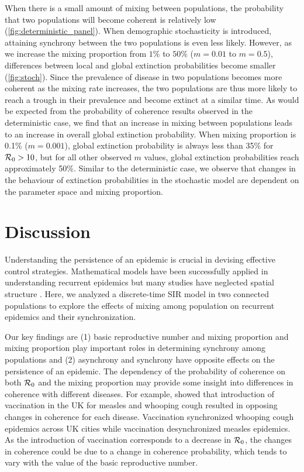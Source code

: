 \documentclass[12pt]{article}
\newcommand{\R}{{\cal R}}
\begin{document}
When there is a small amount of mixing between populations, the probability that two populations will become coherent is relatively low (\autoref{fig:deterministic_panel}).
When demographic stochasticity is introduced, attaining synchrony between the two populations is even less likely. 
However, as we increase the mixing proportion from $1\%$ to $50\%$ ($m=0.01$ to $m=0.5$), differences between local and global extinction probabilities become smaller (\autoref{fig:stoch}).
Since the prevalence of disease in two populations becomes more coherent as the mixing rate increases, the two populations are thus more likely to reach a trough in their prevalence and become extinct at a similar time. 
As would be expected from the probability of coherence results observed in the deterministic case, we find that an increase in mixing between populations leads to an increase in overall global extinction probability. When mixing proportion is 0.1\% ($m = 0.001$), global extinction probability is always less than 35\% for $\R_0 > 10$, but for all other observed $m$ values, global extinction probabilities reach approximately 50\%. 
Similar to the deterministic case, we observe that changes in the behaviour of extinction probabilities in the stochastic model are dependent on the parameter space and mixing proportion.

\section{Discussion}
\label{sec:discussion}

Understanding the persistence of an epidemic is crucial in devising effective control strategies.
Mathematical models have been successfully applied in understanding recurrent epidemics but many studies have neglected spatial structure \cite{earn2000simple, dalziel2016persistent}.
Here, we analyzed a discrete-time SIR model in two connected populations to explore the effects of mixing among population on recurrent epidemics and their synchronization.

Our key findings are (1) basic reproductive number and mixing proportion and mixing proportion play important roles in determining synchrony among populations and (2) asynchrony and synchrony have opposite effects on the persistence of an epidemic.
The dependency of the probability of coherence on both $\R_0$ and the mixing proportion may provide some insight into differences in coherence with different diseases. 
For example, \cite{rohani1999opposite} showed that introduction of vaccination in the UK for measles and whooping cough resulted in opposing changes in coherence for each disease. 
Vaccination synchronized whooping cough epidemics across UK cities while vaccination desynchronized measles epidemics. 
As the introduction of vaccination corresponds to a decrease in $\R_0$, the changes in coherence could be due to a change in coherence probability, which tends to vary with the value of the basic reproductive number. 
\end{document}
